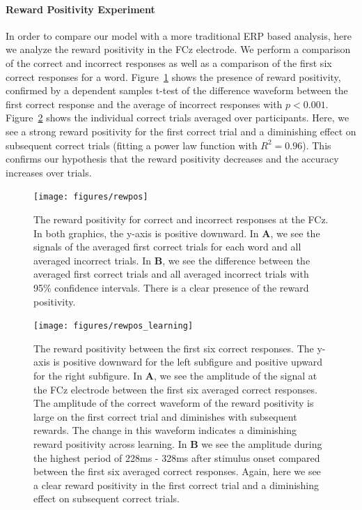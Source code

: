 \paragraph{Reward Positivity Experiment} In order to compare our model with a more traditional ERP based analysis, here we analyze the reward positivity in the FCz electrode. We perform a comparison of the correct and incorrect responses as well as a comparison of the first six correct responses for a word. Figure~\ref{fig:rewpos} shows the presence of reward positivity, confirmed by a dependent samples t-test of the difference waveform between the first correct response and the average of incorrect responses with $p < 0.001$. Figure~\ref{fig:rewpos_learning} shows the individual correct trials averaged over participants.  Here, we see a strong reward positivity for the first correct trial and a diminishing effect on subsequent correct trials (fitting a power law function with $R^2 = 0.96$). This confirms our hypothesis that the reward positivity decreases and the \tvt accuracy increases over trials.

\begin{figure}[t]
  \centerline{
    \texttt{[image: figures/rewpos]}
  }
  \caption{The reward positivity for correct and incorrect responses at the FCz. In both graphics, the y-axis is positive downward. In {\bf A}, we see the signals of the averaged first correct trials for each word and all averaged incorrect trials. In {\bf B}, we see the difference between the averaged first correct trials and all averaged incorrect trials with 95\% confidence intervals. There is a clear presence of the reward positivity.}
  \label{fig:rewpos}
\end{figure}

\begin{figure}[t]
  \centerline{
    \texttt{[image: figures/rewpos\_learning]}
  }
  \caption{The reward positivity between the first six correct responses. The y-axis is positive downward for the left subfigure and positive upward for the right subfigure. In {\bf A}, we see the amplitude of the signal at the FCz electrode between the first six averaged correct responses. The amplitude of the correct waveform of the reward positivity is large on the first correct trial and diminishes with subsequent rewards. The change in this waveform indicates a diminishing reward positivity across learning. In {\bf B} we see the amplitude during the highest period of 228ms - 328ms after stimulus onset compared between the first six averaged correct responses. Again, here we see a clear reward positivity in the first correct trial and a diminishing effect on subsequent correct trials.}
  \label{fig:rewpos_learning}
\end{figure}

